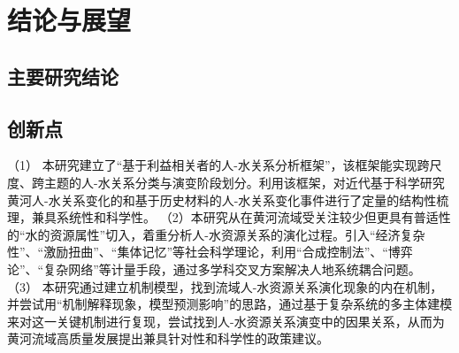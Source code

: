 \chapter{结论与展望}

\section{主要研究结论}

\section{创新点}
（1） 本研究建立了“基于利益相关者的人-水关系分析框架”，该框架能实现跨尺度、跨主题的人-水关系分类与演变阶段划分。利用该框架，对近代基于科学研究黄河人-水关系变化的和基于历史材料的人-水关系变化事件进行了定量的结构性梳理，兼具系统性和科学性。
（2）本研究从在黄河流域受关注较少但更具有普适性的“水的资源属性”切入，着重分析人-水资源关系的演化过程。引入“经济复杂性”、“激励扭曲”、“集体记忆”等社会科学理论，利用“合成控制法”、“博弈论”、“复杂网络”等计量手段，通过多学科交叉方案解决人地系统耦合问题。
（3） 本研究通过建立机制模型，找到流域人-水资源关系演化现象的内在机制，并尝试用“机制解释现象，模型预测影响”的思路，通过基于复杂系统的多主体建模来对这一关键机制进行复现，尝试找到人-水资源关系演变中的因果关系，从而为黄河流域高质量发展提出兼具针对性和科学性的政策建议。






